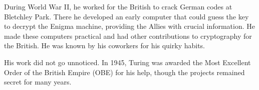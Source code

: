 \documentclass[11pt, letterpaper, twoside, openright]{book}
\begin{document}

During World War II, he worked for the British to crack German codes at Bletchley Park. There he developed an early computer that could guess the key to decrypt the Enigma machine, providing the Allies with crucial information. He made these computers practical and had other contributions to cryptography for the  British. He was known by his coworkers for his quirky habits.





His work did not go unnoticed. In 1945, Turing was awarded the Most Excellent Order of the British Empire (OBE) for his help, though the projects remained secret for many years.
\end{document}
